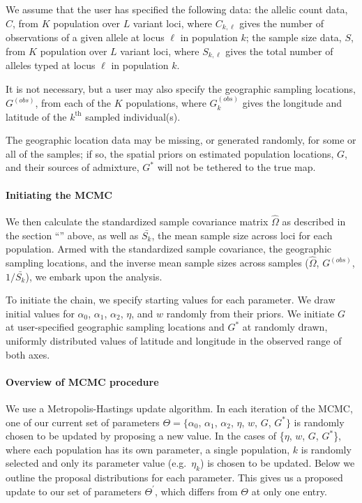 \documentclass[10pt,letterpaper]{article}
\newcommand{\identifyadmixsource}[1]{{#1^{*}}}
\newcommand{\secref}[1]{``\nameref{#1}''}
\begin{document}
We assume that the user has specified the following data: 
the allelic count data, $C$, from $K$ population over $L$ variant loci, where $C_{k,\ell}$ gives the number of observations of a given allele at locus $\ell$ in population $k$;
the sample size data, $S$, from $K$ population over $L$ variant loci, where $S_{k,\ell}$ gives the total number of alleles typed at locus $\ell$ in population $k$.

It is not necessary, but a user may also specify 
the geographic sampling locations, $G^{(obs)}$, from each of the $K$ populations, where $G^{(obs)}_k$ gives the longitude and latitude of the $k^\mathrm{th}$ sampled individual(s).

The geographic location data may be missing, or generated randomly, for some or all of the samples; if so, the spatial priors on estimated population locations, $G$, and their sources of admixture, $\identifyadmixsource{G}$ will not be tethered to the true map. 

\paragraph{Initiating the MCMC}
We then calculate the standardized sample covariance matrix $\widehat{\Omega}$ as described in the section \secref{ss:cov_methods} above,
as well as $\bar{S_k}$, the mean sample size across loci for each population.
Armed with the standardized sample covariance, the geographic sampling locations, and the inverse mean sample sizes across samples ($\widehat{\Omega}$, $G^{(obs)}$, $1/\bar{S_k}$), we embark upon the analysis.

To initiate the chain, we specify starting values for each parameter.  We draw initial values for $\alpha_0$, $\alpha_1$, $\alpha_2$, $\eta$, and $w$ randomly from their priors.  We initiate $G$ at user-specified geographic sampling locations and $\identifyadmixsource{G}$ at randomly drawn, uniformly distributed values of latitude and longitude in the observed range of both axes.  

\paragraph{Overview of MCMC procedure}
We use a Metropolis-Hastings update algorithm. 
In each iteration of the MCMC, one of our current set of parameters 
$\Theta= \{\alpha_0$, $\alpha_1$, $\alpha_2$, $\eta$, $w$, $G$, $\identifyadmixsource{G}\}$ 
is randomly chosen to be updated by proposing a new value.  
In the cases of \{$\eta$, $w$, $G$, $\identifyadmixsource{G}$\}, where each population has its own parameter, a single population, $k$ 
is randomly selected and only its parameter value (e.g.\ $\eta_k$) is chosen to be updated. 
Below we outline the proposal distributions for each parameter. 
This gives us a proposed update to our set of parameters $\Theta^{\prime}$, which differs from $\Theta$ at only one entry.
\end{document}

